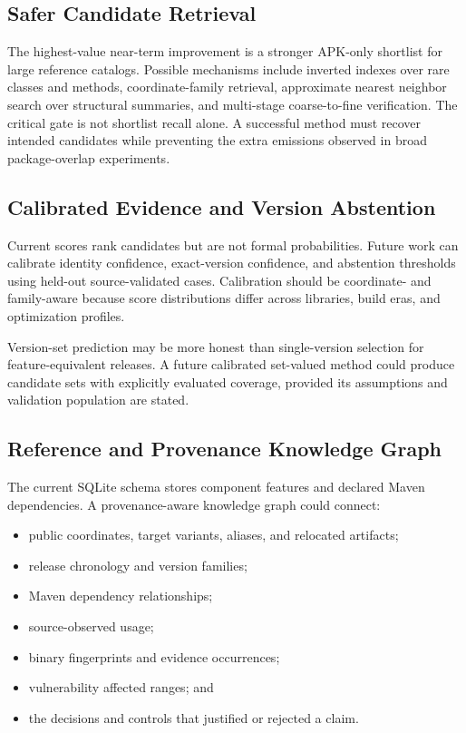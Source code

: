 \subsection{Safer Candidate Retrieval}

The highest-value near-term improvement is a stronger APK-only shortlist for
large reference catalogs. Possible mechanisms include inverted indexes over
rare classes and methods, coordinate-family retrieval, approximate nearest
neighbor search over structural summaries, and multi-stage coarse-to-fine
verification. The critical gate is not shortlist recall alone. A successful
method must recover intended candidates while preventing the extra emissions
observed in broad package-overlap experiments.

\subsection{Calibrated Evidence and Version Abstention}

Current scores rank candidates but are not formal probabilities. Future work
can calibrate identity confidence, exact-version confidence, and abstention
thresholds using held-out source-validated cases. Calibration should be
coordinate- and family-aware because score distributions differ across
libraries, build eras, and optimization profiles.

Version-set prediction may be more honest than single-version selection for
feature-equivalent releases. A future calibrated set-valued method could
produce candidate sets with explicitly evaluated coverage, provided its
assumptions and validation population are stated.

\subsection{Reference and Provenance Knowledge Graph}

The current SQLite schema stores component features and declared Maven
dependencies. A provenance-aware knowledge graph could connect:

\begin{itemize}
  \item public coordinates, target variants, aliases, and relocated
  artifacts;
  \item release chronology and version families;
  \item Maven dependency relationships;
  \item source-observed usage;
  \item binary fingerprints and evidence occurrences;
  \item vulnerability affected ranges; and
  \item the decisions and controls that justified or rejected a claim.
\end{itemize}

